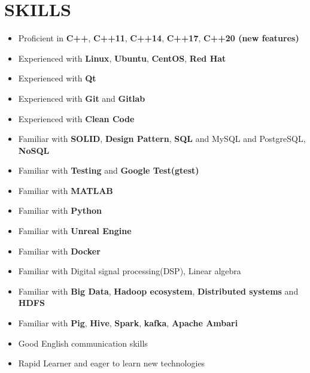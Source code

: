 \documentclass[11pt,a4paper,roman]{moderncv}
\begin{document}
{{\section{SKILLS}
\begin{minipage}{\maincolumnwidth}%
  \small{
      \begin{itemize}
	  \item Proficient  in \textbf{C++}, \textbf{C++11}, \textbf{C++14}, \textbf{C++17}, \textbf{C++20 (new features)}
          \item Experienced with \textbf{Linux}, \textbf{Ubuntu}, \textbf{CentOS}, \textbf{Red Hat}
          \item Experienced with \textbf{Qt}
          \item Experienced with \textbf{Git} and \textbf{Gitlab}
	  \item Experienced with \textbf{Clean Code}
	  \item Familiar with \textbf{SOLID}, \textbf{Design Pattern}, \textbf{SQL} and MySQL and PostgreSQL, \textbf{NoSQL}
	  \item Familiar with \textbf{Testing} and \textbf{Google Test(gtest)}
	  \item Familiar with \textbf{MATLAB}
	  \item Familiar with \textbf{Python}
	  \item Familiar with \textbf{Unreal Engine}
	  \item Familiar with \textbf{Docker}
	  \item Familiar with Digital signal processing(DSP), Linear algebra
	  \item Familiar with \textbf{Big Data}, \textbf{Hadoop ecosystem}, \textbf{Distributed systems} and \textbf{HDFS}
	  \item Familiar with \textbf{Pig}, \textbf{Hive}, \textbf{Spark}, \textbf{kafka}, \textbf{Apache Ambari}
          \item Good English communication skills
          \item Rapid Learner and eager to learn new technologies
    \end{itemize}}%
\end{minipage}%
      
}

}

\nocite{*}

 
\end{document}
